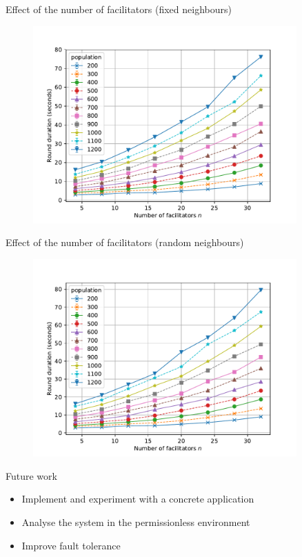 \documentclass{beamer}
\begin{document}
\begin{frame}[noframenumbering]{Effect of the number of facilitators (fixed neighbours)}
  \begin{figure}
    \includegraphics[width=0.9\textwidth]{neighbour-fixed/round-duration-vs-facilitators}
    \centering
  \end{figure}
\end{frame}

\begin{frame}[noframenumbering]{Effect of the number of facilitators (random neighbours)}
  \begin{figure}
    \includegraphics[width=0.9\textwidth]{neighbour-random/round-duration-vs-facilitators}
    \centering
  \end{figure}
\end{frame}

\begin{frame}[noframenumbering]{Future work}
\begin{itemize}
\item Implement and experiment with a concrete application
\item Analyse the system in the permissionless environment
\item Improve fault tolerance
\end{itemize}
\end{frame}
\end{document}
